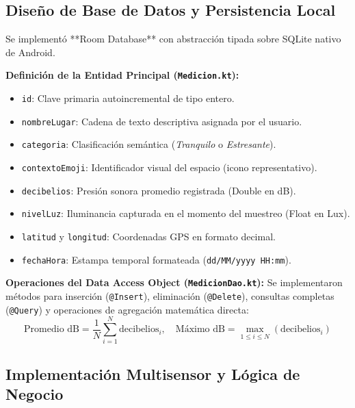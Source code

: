 \documentclass[12pt,a4paper]{article}
\begin{document}
\subsection{Diseño de Base de Datos y Persistencia Local}

Se implementó **Room Database** con abstracción tipada sobre SQLite nativo de Android.

\textbf{Definición de la Entidad Principal (\texttt{Medicion.kt}):}
\begin{itemize}[leftmargin=*]
    \item \texttt{id}: Clave primaria autoincremental de tipo entero.
    \item \texttt{nombreLugar}: Cadena de texto descriptiva asignada por el usuario.
    \item \texttt{categoria}: Clasificación semántica (\textit{Tranquilo} o \textit{Estresante}).
    \item \texttt{contextoEmoji}: Identificador visual del espacio (icono representativo).
    \item \texttt{decibelios}: Presión sonora promedio registrada (Double en dB).
    \item \texttt{nivelLuz}: Iluminancia capturada en el momento del muestreo (Float en Lux).
    \item \texttt{latitud} y \texttt{longitud}: Coordenadas GPS en formato decimal.
    \item \texttt{fechaHora}: Estampa temporal formateada (\texttt{dd/MM/yyyy HH:mm}).
\end{itemize}

\textbf{Operaciones del Data Access Object (\texttt{MedicionDao.kt}):}
Se implementaron métodos para inserción (\texttt{@Insert}), eliminación (\texttt{@Delete}), consultas completas (\texttt{@Query}) y operaciones de agregación matemática directa:
\begin{equation}
\text{Promedio dB} = \frac{1}{N}\sum_{i=1}^{N} \text{decibelios}_i, \quad \text{Máximo dB} = \max_{1 \le i \le N}(\text{decibelios}_i)
\end{equation}

\subsection{Implementación Multisensor y Lógica de Negocio}
\end{document}
